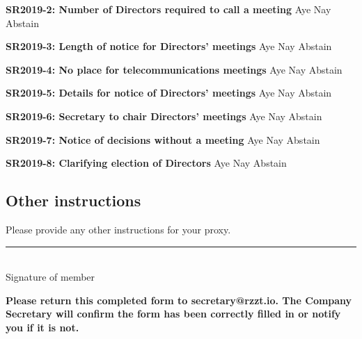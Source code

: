 \documentclass[a4paper,10pt]{article}
\begin{document}
\begin{Form}
\textbf{SR2019-2: Number of Directors required to call a meeting} \hfill
\ChoiceMenu[radio,radiosymbol=\ding{108},name=sr2]{ }{ }Aye
\ChoiceMenu[radio,radiosymbol=\ding{108},name=sr2]{ }{ }Nay
\ChoiceMenu[radio,radiosymbol=\ding{108},name=sr2]{ }{ }Abstain

\textbf{SR2019-3: Length of notice for Directors' meetings} \hfill
\ChoiceMenu[radio,radiosymbol=\ding{108},name=sr3]{ }{ }Aye
\ChoiceMenu[radio,radiosymbol=\ding{108},name=sr3]{ }{ }Nay
\ChoiceMenu[radio,radiosymbol=\ding{108},name=sr3]{ }{ }Abstain

\textbf{SR2019-4: No place for telecommunications meetings} \hfill
\ChoiceMenu[radio,radiosymbol=\ding{108},name=sr4]{ }{ }Aye
\ChoiceMenu[radio,radiosymbol=\ding{108},name=sr4]{ }{ }Nay
\ChoiceMenu[radio,radiosymbol=\ding{108},name=sr4]{ }{ }Abstain

\textbf{SR2019-5: Details for notice of Directors' meetings} \hfill
\ChoiceMenu[radio,radiosymbol=\ding{108},name=sr5]{ }{ }Aye
\ChoiceMenu[radio,radiosymbol=\ding{108},name=sr5]{ }{ }Nay
\ChoiceMenu[radio,radiosymbol=\ding{108},name=sr5]{ }{ }Abstain

\textbf{SR2019-6: Secretary to chair Directors' meetings} \hfill
\ChoiceMenu[radio,radiosymbol=\ding{108},name=sr6]{ }{ }Aye
\ChoiceMenu[radio,radiosymbol=\ding{108},name=sr6]{ }{ }Nay
\ChoiceMenu[radio,radiosymbol=\ding{108},name=sr6]{ }{ }Abstain

\textbf{SR2019-7: Notice of decisions without a meeting} \hfill
\ChoiceMenu[radio,radiosymbol=\ding{108},name=sr7]{ }{ }Aye
\ChoiceMenu[radio,radiosymbol=\ding{108},name=sr7]{ }{ }Nay
\ChoiceMenu[radio,radiosymbol=\ding{108},name=sr7]{ }{ }Abstain

\textbf{SR2019-8: Clarifying election of Directors} \hfill
\ChoiceMenu[radio,radiosymbol=\ding{108},name=sr8]{ }{ }Aye
\ChoiceMenu[radio,radiosymbol=\ding{108},name=sr8]{ }{ }Nay
\ChoiceMenu[radio,radiosymbol=\ding{108},name=sr8]{ }{ }Abstain

\subsection{Other instructions}

Please provide any other instructions for your proxy.

\begin{framed}%
  \TextField[width=\textwidth,donotscroll=true,multiline=true,name=instructions]{ }%
\end{framed}%

\vspace{1in}
\rule{0.5\textwidth}{0.5pt}\\
Signature of member

\vspace{1in}

\textbf{Please return this completed form to secretary@rzzt.io. The Company Secretary will confirm the form has been correctly filled in or notify you if it is not.}

\end{Form}
\end{document}

